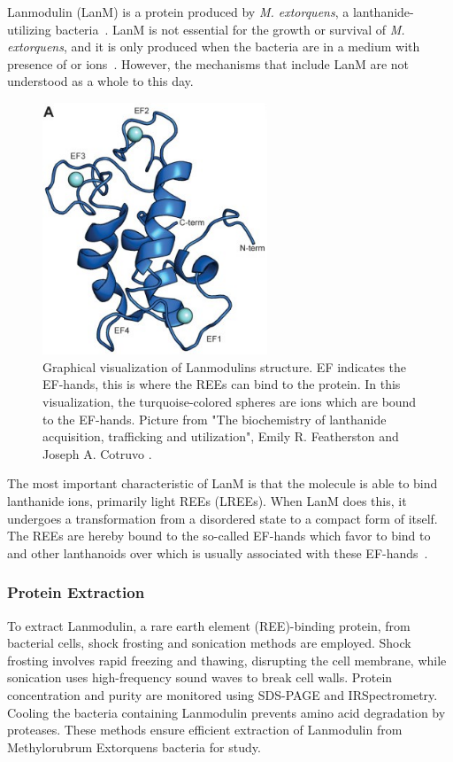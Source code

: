 Lanmodulin (LanM) is a protein produced by \textit{M. extorquens}, a lanthanide-utilizing bacteria~\cite{lanmdiscovery}.
LanM is not essential for the growth or survival of \textit{M. extorquens}, and it is only produced when the bacteria are in a medium with presence of  or  ions~\cite{lanmroleinbiology}.
However, the mechanisms that include LanM are not understood as a whole to this day.

\begin{figure}[H]
    \centering
    \includegraphics[width=0.6\textwidth]{./media/images/lanm_structure}
    \caption{Graphical visualization of Lanmodulins structure. EF indicates the EF-hands, this is where the REEs can bind to the protein. In this visualization, the turquoise-colored spheres are  ions which are bound to the EF-hands. Picture from "The biochemistry of lanthanide acquisition, trafficking and utilization", Emily R. Featherston and Joseph A. Cotruvo \cite{lanmroleinbiology}.}
    \label{fig:lanm_structure}
\end{figure}

The most important characteristic of LanM is that the molecule is able to bind lanthanide ions, primarily light REEs (LREEs).
When LanM does this, it undergoes a transformation from a disordered state to a compact form of itself.
The REEs are hereby bound to the so-called EF-hands which favor to bind to  and other lanthanoids over  which is usually associated with these EF-hands~\cite{lanmstructure}.





\subsubsection{Protein Extraction\authorB{}}
To extract Lanmodulin, a rare earth element (REE)-binding protein, from bacterial cells, shock
frosting and sonication methods are employed. Shock frosting involves rapid freezing and
thawing, disrupting the cell membrane, while sonication uses high-frequency sound waves to
break cell walls. Protein concentration and purity are monitored using SDS-PAGE and IRSpectrometry. Cooling the bacteria containing Lanmodulin prevents amino acid degradation
by proteases. These methods ensure efficient extraction of Lanmodulin from Methylorubrum
Extorquens bacteria for study.


